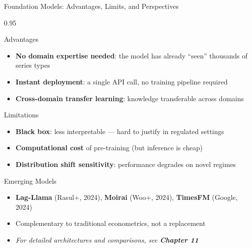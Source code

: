 \documentclass[9pt, aspectratio=169, t]{beamer}
\begin{document}
\begin{frame}{Foundation Models: Advantages, Limits, and Perspectives}
    \vspace{-2mm}
    \begin{cminipage}{0.95\textwidth}
        {\scriptsize
        \begin{exampleblock}{Advantages}
            \begin{itemize}\setlength{\itemsep}{0pt}
                \item \textbf{No domain expertise needed}: the model has already ``seen'' thousands of series types
                \item \textbf{Instant deployment}: a single API call, no training pipeline required
                \item \textbf{Cross-domain transfer learning}: knowledge transferable across domains
            \end{itemize}
        \end{exampleblock}
        \vspace{-2mm}
        \begin{alertblock}{Limitations}
            \begin{itemize}\setlength{\itemsep}{0pt}
                \item \textbf{Black box}: less interpretable --- hard to justify in regulated settings
                \item \textbf{Computational cost} of pre-training (but inference is cheap)
                \item \textbf{Distribution shift sensitivity}: performance degrades on novel regimes
            \end{itemize}
        \end{alertblock}
        \vspace{-2mm}
        \begin{block}{Emerging Models}
            \begin{itemize}\setlength{\itemsep}{0pt}
                \item \textbf{Lag-Llama} (Rasul+, 2024), \textbf{Moirai} (Woo+, 2024), \textbf{TimesFM} (Google, 2024)
                \item Complementary to traditional econometrics, not a replacement
                \item \textit{For detailed architectures and comparisons, see \textbf{Chapter 11}}
            \end{itemize}
        \end{block}
        }
    \end{cminipage}
\end{frame}
\end{document}
